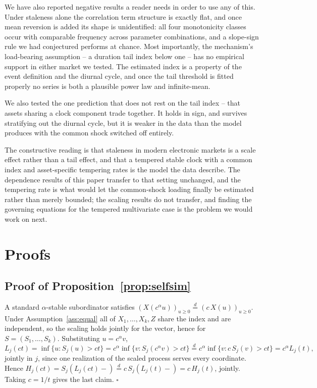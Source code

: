 \documentclass{ws-ijtaf}
\newcommand{\eqd}{\stackrel{d}{=}}
\providecommand{\qed}{\hfill\ensuremath{\square}}
\begin{document}
We have also reported negative results a reader needs in order to use any of
this. Under staleness alone the correlation term structure is exactly flat, and
once mean reversion is added its shape is unidentified: all four monotonicity
classes occur with comparable frequency across \sweepN{} parameter
combinations, and a slope-sign rule we had conjectured performs at chance. Most
importantly, the mechanism's load-bearing assumption -- a duration tail index
below one -- has no empirical support in either market we tested. The estimated
index is a property of the event definition and the diurnal cycle, and once the
tail threshold is fitted properly no series is both a plausible power law and
infinite-mean.

We also tested the one prediction that does not rest on the tail index --
that assets sharing a clock component trade together. It holds in sign, and
survives stratifying out the diurnal cycle, but it is weaker in the data than
the model produces with the common shock switched off entirely.

The constructive reading is that staleness in modern electronic markets is a
scale effect rather than a tail effect, and that a tempered stable clock with a
common index and asset-specific tempering rates is the model the data describe.
The dependence results of this paper transfer to that setting unchanged, and
the tempering rate is what would let the common-shock loading finally be
estimated rather than merely bounded; the scaling results do not transfer, and
finding the governing equations for the tempered multivariate case is the
problem we would work on next.

\appendix

\section{Proofs}\label{app:proofs}

\subsection*{Proof of Proposition~\ref{prop:selfsim}}

A standard $\alpha$-stable subordinator satisfies
$(X(c^{\alpha}u))_{u\ge0} \eqd (c\,X(u))_{u\ge0}$. Under
Assumption~\ref{ass:equal} all of $X_1,\dots,X_k,Z$ share the index and are
independent, so the scaling holds jointly for the vector, hence for
$S=(S_1,\dots,S_k)$. Substituting $u=c^{\alpha}v$,
\begin{equation}
L_j(ct) = \inf\{u: S_j(u)>ct\}
        = c^{\alpha}\inf\{v: S_j(c^{\alpha}v)>ct\}
        \eqd c^{\alpha}\inf\{v: c\,S_j(v)>ct\}
        = c^{\alpha}L_j(t),
\end{equation}
jointly in $j$, since one realization of the scaled process serves every
coordinate. Hence $H_j(ct)=S_j(L_j(ct)-)\eqd c\,S_j(L_j(t)-)=c\,H_j(t)$,
jointly. Taking $c=1/t$ gives the last claim. \qed
\end{document}
